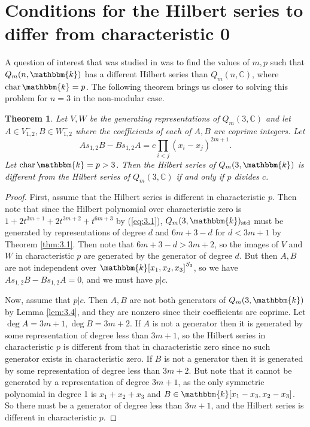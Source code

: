 \documentclass[11pt]{article}
\newtheorem{theorem}{Theorem}[section]
\theoremstyle{definition}
\renewcommand{\k}{\mathbbm{k}}
\newcommand{\std}{\mathrm{std}}
\renewcommand{\char}{\text{char\,}}
\newcommand{\C}{\mathbb{C}}
\begin{document}
\section{Conditions for the Hilbert series to differ from characteristic 0}\label{sec:4}

A question of interest that was studied in \cite{Ren_2020} was to find the values of $m,p$ such that $Q_m(n,\k)$ has a different Hilbert series than $Q_m(n,\C)$, where $\char\k=p$. The following theorem brings us closer to solving this problem for $n=3$ in the non-modular case.

\begin{theorem}\label{thm:4.1}
    Let $V,W$ be the generating representations of $Q_m(3,\C)$ and let $A\in V_{1,2}^-,B\in W_{1,2}^-$ where the coefficients of each of $A,B$ are coprime integers. Let 
    $$As_{1,2}B-Bs_{1,2}A=c\prod_{i<j}(x_i-x_j)^{2m+1}.$$
    Let $\mathrm{char}\,\k=p>3$. Then the Hilbert series of $Q_m(3,\k)$ is different from the Hilbert series of $Q_m(3,\C)$ if and only if $p$ divides $c$.
\end{theorem}
\begin{proof}
    First, assume that the Hilbert series is different in characteristic $p$. Then note that since the Hilbert polynomial over characteristic zero is $1+2t^{3m+1}+2t^{3m+2}+t^{6m+3}$ by (\ref{eq:3.1}), $Q_m(3,\k)_\std$ must be generated by representations of degree $d$ and $6m+3-d$ for $d<3m+1$ by Theorem \ref{thm:3.1}. Then note that $6m+3-d>3m+2$, so the images of $V$ and $W$ in characteristic $p$ are generated by the generator of degree $d$. But then $A,B$ are not independent over $\k[x_1,x_2,x_3]^{S_3}$, so we have $As_{1,2}B-Bs_{1,2}A=0$, and we must have $p|c$. 
    
    Now, assume that $p|c$. Then $A,B$ are not both generators of $Q_m(3,\k)$ by Lemma \ref{lem:3.4}, and they are nonzero since their coefficients are coprime. Let $\deg A=3m+1,\deg B=3m+2$. If $A$ is not a generator then it is generated by some representation of degree less than $3m+1$, so the Hilbert series in characteristic $p$ is different from that in characteristic zero since no such generator exists in characteristic zero. If $B$ is not a generator then it is generated by some representation of degree less than $3m+2$. But note that it cannot be generated by a representation of degree $3m+1$, as the only symmetric polynomial in degree 1 is $x_1+x_2+x_3$ and $B\in\k[x_1-x_3,x_2-x_3]$. So there must be a generator of degree less than $3m+1$, and the Hilbert series is different in characteristic $p$.
\end{proof}
\end{document}
